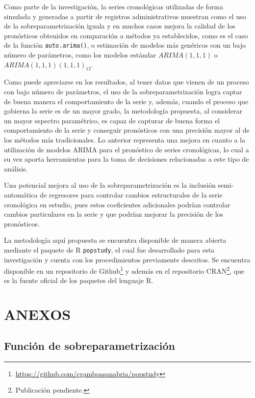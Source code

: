 \documentclass[
]{article}
\begin{document}
Como parte de la investigación, la series cronológicas utilizadas de
forma simulada y generadas a partir de registros administrativos
muestran como el uso de la sobreparametrización iguala y en muchos casos
mejora la calidad de los pronósticos obtenidos en comparación a métodos
ya establecidos, como es el caso de la función \texttt{auto.arima()}, o
estimación de modelos más genéricos con un bajo número de parámetros,
como los modelos estándar \(ARIMA(1,1,1)\) o
\(ARIMA(1,1,1)(1,1,1)_{12}\).

Como puede apreciarse en los resultados, al tener datos que vienen de un
proceso con bajo número de parámetros, el uso de la sobreparametrización
logra captar de buena manera el comportamiento de la serie y, además,
cuando el proceso que gobierna la serie es de un mayor grado, la
metodología propuesta, al considerar un mayor espectro paramétrico, es
capaz de capturar de buena forma el comportamiento de la serie y
conseguir pronósticos con una precisión mayor al de los métodos más
tradicionales. Lo anterior representa una mejora en cuanto a la
utilización de modelos ARIMA para el pronóstico de series cronológicas,
lo cual a su vez aporta herramientas para la toma de decisiones
relacionadas a este tipo de análisis.

Una potencial mejora al uso de la sobreparametrización es la inclusión
semi-automática de regresores para controlar cambios estructurales de la
serie cronológica en estudio, pues estos coeficientes adicionales
podrían controlar cambios particulares en la serie y que podrían mejorar
la precisión de los pronósticos.

La metodología aquí propuesta se encuentra disponible de manera abierta
mediante el paquete de R \texttt{popstudy}, el cual fue desarrollado
para esta investigación y cuenta con los procedimientos previamente
descritos. Se encuentra disponible en un repositorio de
Github\footnote{\url{https://github.com/cgamboasanabria/popstudy}} y
además en el repositorio CRAN\footnote{Publicación pendiente.}, que es
la fuente oficial de los paquetes del lenguaje R.

\newpage

\section{ANEXOS}

\subsection{Función de sobreparametrización}
\end{document}
